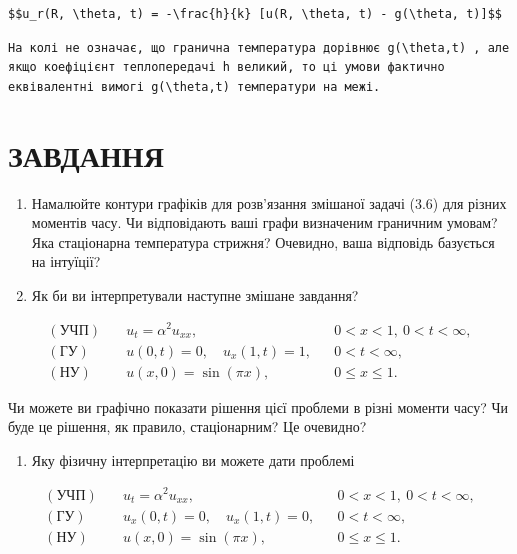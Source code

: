 \documentclass[
  ukrainian,
]{article}
\providecommand{\tightlist}{%
  \setlength{\itemsep}{0pt}\setlength{\parskip}{0pt}}
\begin{document}
\begin{verbatim}
$$u_r(R, \theta, t) = -\frac{h}{k} [u(R, \theta, t) - g(\theta, t)]$$
\end{verbatim}

\begin{verbatim}
На колі не означає, що гранична температура дорівнює g(\theta,t) , але якщо коефіцієнт теплопередачі h великий, то ці умови фактично еквівалентні вимогі g(\theta,t) температури на межі.
\end{verbatim}

\section{ЗАВДАННЯ}\label{ux437ux430ux432ux434ux430ux43dux43dux44f-2}

\begin{enumerate}
\def\labelenumi{\arabic{enumi}.}
\item
  Намалюйте контури графіків для розв'язання змішаної задачі (3.6) для
  різних моментів часу. Чи відповідають ваші графи визначеним граничним
  умовам? Яка стаціонарна температура стрижня? Очевидно, ваша відповідь
  базується на інтуїції?
\item
  Як би ви інтерпретували наступне змішане завдання?
\end{enumerate}

\[
\begin{aligned}
(\text{УЧП})\quad & u_t = \alpha^2 u_{xx}, && 0 < x < 1,\ 0 < t < \infty, \\
(\text{ГУ})\quad & u(0,t) = 0,\quad u_x(1,t) = 1, && 0 < t < \infty, \\
(\text{НУ})\quad & u(x,0) = \sin(\pi x), && 0 \leqslant x \leqslant 1.
\end{aligned}
\]

Чи можете ви графічно показати рішення цієї проблеми в різні моменти
часу? Чи буде це рішення, як правило, стаціонарним? Це очевидно?

\begin{enumerate}
\def\labelenumi{\arabic{enumi}.}
\setcounter{enumi}{2}
\tightlist
\item
  Яку фізичну інтерпретацію ви можете дати проблемі
\end{enumerate}

\[
\begin{aligned}
(\text{УЧП})\quad & u_t = \alpha^2 u_{xx}, && 0 < x < 1,\ 0 < t < \infty, \\
(\text{ГУ})\quad & u_x(0,t) = 0,\quad u_x(1,t) = 0, && 0 < t < \infty, \\
(\text{НУ})\quad & u(x,0) = \sin(\pi x), && 0 \leqslant x \leqslant 1.
\end{aligned}
\]
\end{document}
